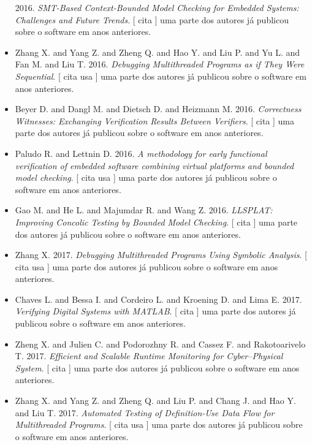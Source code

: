 \begin{itemize}
      2016.
        \textit{ SMT-Based Context-Bounded Model Checking for Embedded Systems: Challenges and Future Trends}.
      [
          cita
      ]
uma parte dos autores já publicou sobre o software em anos anteriores.
\item Zhang X. and Yang Z. and Zheng Q. and Hao Y. and Liu P. and Yu L. and Fan M. and Liu T.
      2016.
        \textit{ Debugging Multithreaded Programs as if They Were Sequential}.
      [
          cita
          usa
      ]
uma parte dos autores já publicou sobre o software em anos anteriores.
\item Beyer D. and Dangl M. and Dietsch D. and Heizmann M.
      2016.
        \textit{ Correctness Witnesses: Exchanging Verification Results Between Verifiers}.
      [
          cita
      ]
uma parte dos autores já publicou sobre o software em anos anteriores.
\item Paludo R. and Lettnin D.
      2016.
        \textit{ A methodology for early functional verification of embedded software combining virtual platforms and bounded model checking}.
      [
          cita
          usa
      ]
uma parte dos autores já publicou sobre o software em anos anteriores.
\item Gao M. and He L. and Majumdar R. and Wang Z.
      2016.
        \textit{ LLSPLAT: Improving Concolic Testing by Bounded Model Checking}.
      [
          cita
      ]
uma parte dos autores já publicou sobre o software em anos anteriores.
\item Zhang X.
      2017.
        \textit{ Debugging Multithreaded Programs Using Symbolic Analysis}.
      [
          cita
          usa
      ]
uma parte dos autores já publicou sobre o software em anos anteriores.
\item Chaves L. and Bessa I. and Cordeiro L. and Kroening D. and Lima E.
      2017.
        \textit{ Verifying Digital Systems with MATLAB}.
      [
          cita
      ]
uma parte dos autores já publicou sobre o software em anos anteriores.
\item Zheng X. and Julien C. and Podorozhny R. and Cassez F. and Rakotoarivelo T.
      2017.
        \textit{ Efficient and Scalable Runtime Monitoring for Cyber--Physical System}.
      [
          cita
      ]
uma parte dos autores já publicou sobre o software em anos anteriores.
\item Zhang X. and Yang Z. and Zheng Q. and Liu P. and Chang J. and Hao Y. and Liu T.
      2017.
        \textit{ Automated Testing of Definition-Use Data Flow for Multithreaded Programs}.
      [
          cita
          usa
      ]
uma parte dos autores já publicou sobre o software em anos anteriores.
\end{itemize}
